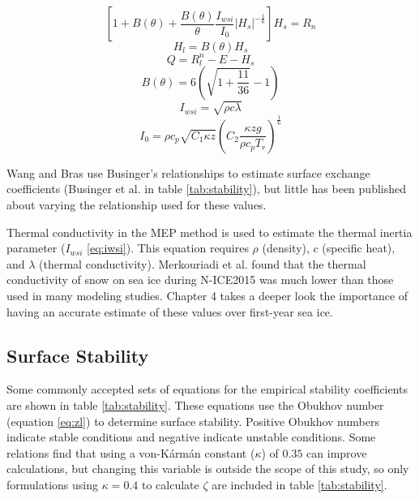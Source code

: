 \begin{equation}\label{eq:mep:rn}
\left[ 1 + B(\theta) + \frac{B(\theta)}{\theta} \frac{I_{wsi}}{I_{0}} | H_{s} | ^{-\frac{1}{6}} \right] H_{s} = R_{n}
\end{equation}
\begin{equation}\label{eq:mep:hl}
H_{l} = B(\theta) H_{s}
\end{equation}
\begin{equation}\label{eq:mep:hs}
Q = R_{l}^{n} - E - H_{s}
\end{equation}
\begin{equation}\label{eq:mep:b}
B(\theta) = 6 \left( \sqrt{1 + \frac{11}{36}} - 1 \right)
\end{equation}
\begin{equation}\label{eq:iwsi}
I_{wsi} = \sqrt{\rho c \lambda}
\end{equation}
\begin{equation}\label{eq:i0}
I_{0} = \rho c_{p} \sqrt{C_{1}\kappa z} \left( C_{2} \frac{\kappa zg}{\rho c_{p} T_{r}} \right)^{\frac{1}{6}}
\end{equation}

Wang and Bras \cite{wang:2009} use Businger's relationships \cite{businger:1971} to estimate surface exchange coefficients (Businger et al. \cite{businger:1971} in table \ref{tab:stability}), but little has been published about varying the relationship used for these values. 

Thermal conductivity in the MEP method is used to estimate the thermal inertia parameter ($I_{wsi}$ \ref{eq:iwsi}). This equation requires $\rho$ (density), $c$ (specific heat), and $\lambda$ (thermal conductivity). Merkouriadi et al. \cite{merkouriadi:2017} found that the thermal conductivity of snow on sea ice during N-ICE2015 was much lower than those used in many modeling studies. Chapter 4 takes a deeper look the importance of having an accurate estimate of these values over first-year sea ice. 

\subsection{Surface Stability}

Some commonly accepted sets of equations for the empirical stability coefficients are shown in table \ref{tab:stability}. These equations use the Obukhov number (equation \ref{eq:zl}) to determine surface stability. Positive Obukhov numbers indicate stable conditions and negative indicate unstable conditions. Some relations find that using a von-Kármán constant ($\kappa$) of $0.35$ can improve calculations, but changing this variable is outside the scope of this study, so only formulations using $\kappa = 0.4$ to calculate $\zeta$ are included in table \ref{tab:stability}. 

